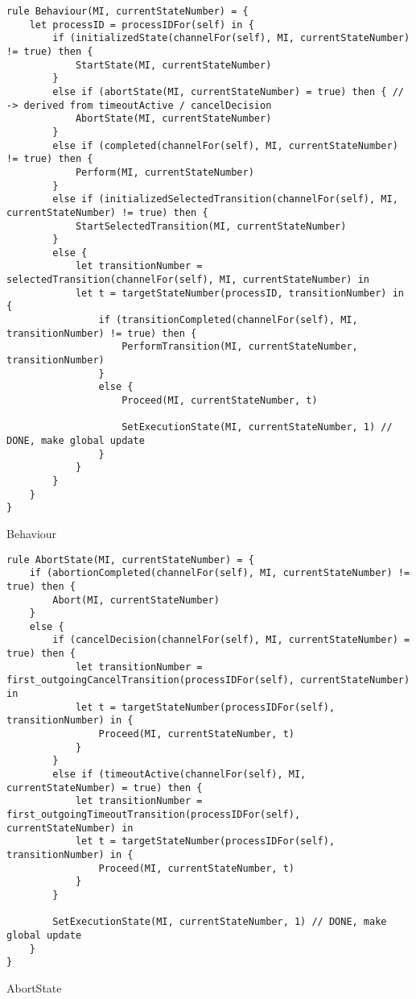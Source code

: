 \begin{listing}[H]
\begin{verbatim}
rule Behaviour(MI, currentStateNumber) = {
    let processID = processIDFor(self) in {
        if (initializedState(channelFor(self), MI, currentStateNumber) != true) then {
            StartState(MI, currentStateNumber)
        }
        else if (abortState(MI, currentStateNumber) = true) then { // -> derived from timeoutActive / cancelDecision
            AbortState(MI, currentStateNumber)
        }
        else if (completed(channelFor(self), MI, currentStateNumber) != true) then {
            Perform(MI, currentStateNumber)
        }
        else if (initializedSelectedTransition(channelFor(self), MI, currentStateNumber) != true) then {
            StartSelectedTransition(MI, currentStateNumber)
        }
        else {
            let transitionNumber = selectedTransition(channelFor(self), MI, currentStateNumber) in
            let t = targetStateNumber(processID, transitionNumber) in {
                if (transitionCompleted(channelFor(self), MI, transitionNumber) != true) then {
                    PerformTransition(MI, currentStateNumber, transitionNumber)
                }
                else {
                    Proceed(MI, currentStateNumber, t)

                    SetExecutionState(MI, currentStateNumber, 1) // DONE, make global update
                }
            }
        }
    }
}
\end{verbatim}
\caption{Behaviour}
\label{lst:asm:Behaviour}
\end{listing}




\begin{listing}[H]
\begin{verbatim}
rule AbortState(MI, currentStateNumber) = {
    if (abortionCompleted(channelFor(self), MI, currentStateNumber) != true) then {
        Abort(MI, currentStateNumber)
    }
    else {
        if (cancelDecision(channelFor(self), MI, currentStateNumber) = true) then {
            let transitionNumber = first_outgoingCancelTransition(processIDFor(self), currentStateNumber) in
            let t = targetStateNumber(processIDFor(self), transitionNumber) in {
                Proceed(MI, currentStateNumber, t)
            }
        }
        else if (timeoutActive(channelFor(self), MI, currentStateNumber) = true) then {
            let transitionNumber = first_outgoingTimeoutTransition(processIDFor(self), currentStateNumber) in
            let t = targetStateNumber(processIDFor(self), transitionNumber) in {
                Proceed(MI, currentStateNumber, t)
            }
        }

        SetExecutionState(MI, currentStateNumber, 1) // DONE, make global update
    }
}
\end{verbatim}
\caption{AbortState}
\label{lst:asm:AbortState}
\end{listing}




